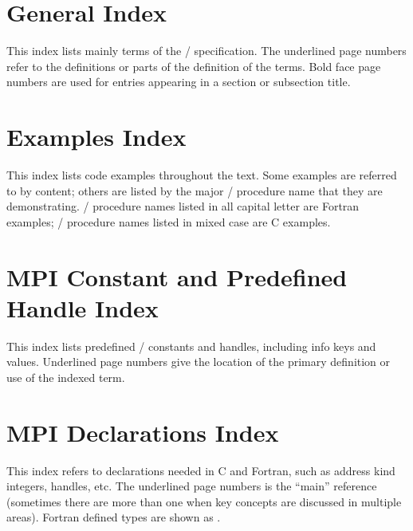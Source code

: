 \newpage
\chapter*{General Index}
\label{index:general}
This index lists mainly terms of the \MPI/ specification. The underlined page numbers refer to the definitions or parts of the definition of the terms. Bold face page numbers are used for entries appearing in a section or subsection title.



\newpage
\chapter*{Examples Index}

\label{index:example}
This index lists code examples throughout the text.  Some examples are referred to by content; others are listed by the major \MPI/ procedure name that they are demonstrating.  \MPI/ procedure names listed in all capital letter are Fortran examples; \MPI/ procedure names listed in mixed case are C examples.



\newpage
\chapter*{MPI Constant and Predefined Handle Index}

\label{index:constant}
This index lists predefined \MPI/ constants and handles, including info keys and values. Underlined page numbers give the location of the primary definition or use of the indexed term.



\newpage
\chapter*{MPI Declarations Index}
\label{index:declaration}
This index refers to declarations needed in C and Fortran, such as address kind integers, handles, etc. The underlined page numbers is the ``main'' reference (sometimes there are more than one when key concepts are discussed in multiple areas). Fortran defined types are shown as .

